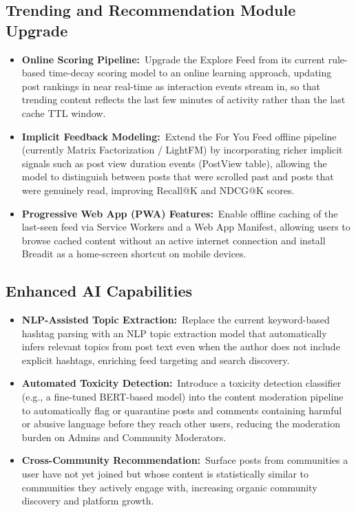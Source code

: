 \subsection{Trending and Recommendation Module Upgrade}
\begin{itemize}
  \item \textbf{Online Scoring Pipeline:}~Upgrade the Explore Feed from its current rule-based time-decay scoring model to an online learning approach, updating post rankings in near real-time as interaction events stream in, so that trending content reflects the last few minutes of activity rather than the last cache TTL window.
  \item \textbf{Implicit Feedback Modeling:}~Extend the For You Feed offline pipeline (currently Matrix Factorization / LightFM) by incorporating richer implicit signals such as post view duration events (PostView table), allowing the model to distinguish between posts that were scrolled past and posts that were genuinely read, improving Recall@K and NDCG@K scores.
  \item \textbf{Progressive Web App (PWA) Features:}~Enable offline caching of the last-seen feed via Service Workers and a Web App Manifest, allowing users to browse cached content without an active internet connection and install Breadit as a home-screen shortcut on mobile devices.
\end{itemize}

\subsection{Enhanced AI Capabilities}
\begin{itemize}
  \item \textbf{NLP-Assisted Topic Extraction:}~Replace the current keyword-based hashtag parsing with an NLP topic extraction model that automatically infers relevant topics from post text even when the author does not include explicit hashtags, enriching feed targeting and search discovery.
  \item \textbf{Automated Toxicity Detection:}~Introduce a toxicity detection classifier (e.g., a fine-tuned BERT-based model) into the content moderation pipeline to automatically flag or quarantine posts and comments containing harmful or abusive language before they reach other users, reducing the moderation burden on Admins and Community Moderators.
  \item \textbf{Cross-Community Recommendation:}~Surface posts from communities a user have not yet joined but whose content is statistically similar to communities they actively engage with, increasing organic community discovery and platform growth.
\end{itemize}

